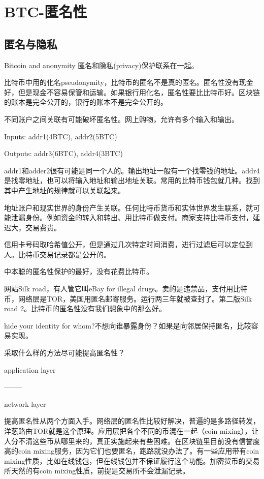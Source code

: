 \documentclass[10pt]{ctexart}
\begin{document}
\section{BTC-匿名性}
\subsection{匿名与隐私}
Bitcoin and anonymity
匿名和隐私(privacy)保护联系在一起。

比特币中用的化名pseudonymity，比特币的匿名不是真的匿名。匿名性没有现金好，但是现金不容易保管和运输。如果银行用化名，匿名性要比比特币好。区块链的账本是完全公开的，银行的账本不是完全公开的。

不同账户之间关联有可能破坏匿名性。网上购物，允许有多个输入和输出。

Inputs: addr1(4BTC), addr2(5BTC)

Outputs: addr3(6BTC), addr4(3BTC)

addr1和adder2很有可能是同一个人的。输出地址一般有一个找零钱的地址。addr4是找零地址，也可以将输入地址和输出地址关联。常用的比特币钱包就几种。找到其中产生地址的规律就可以关联起来。

地址账户和现实世界的身份产生关联。任何比特币货币和实体世界发生联系，就可能泄漏身份。例如资金的转入和转出、用比特币做支付。商家支持比特币支付，延迟大，交易费贵。

信用卡号码取哈希值公开，但是通过几次特定时间消费，进行过滤后可以定位到人。比特币交易记录都是公开的。

中本聪的匿名性保护的最好，没有花费比特币。

网站Silk road，有人管它叫eBay for illegal drugs。卖的是违禁品，支付用比特币，网络层是TOR，美国用匿名邮寄服务。运行两三年就被查封了。第二版Silk road 2。比特币的匿名性没有我们想象中的那么好。

hide your identity for whom?不想向谁暴露身份？如果是向邻居保持匿名，比较容易实现。

采取什么样的方法尽可能提高匿名性？

application layer

--------

network layer

提高匿名性从两个方面入手。网络层的匿名性比较好解决，普遍的是多路径转发，洋葱路由TOR就是这个原理。应用层把各个不同的币混在一起（coin mixing），让人分不清这些币从哪里来的，真正实施起来有些困难。在区块链里目前没有信誉度高的coin mixing服务，因为它们也要匿名，跑路就没办法了。有一些应用带有coin mixing性质，比如在线钱包，但在线钱包并不保证履行这个功能。加密货币的交易所天然的有coin mixing性质，前提是交易所不会泄漏记录。
\end{document}
